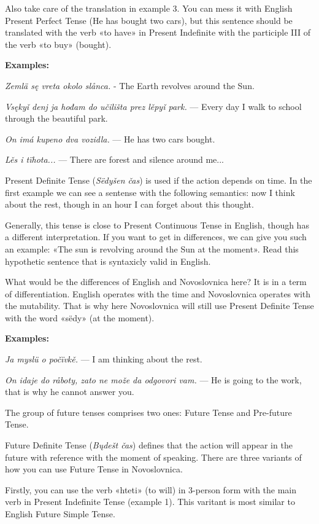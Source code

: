 Also take care of the translation in example 3. You can mess it with English Present Perfect Tense (He has bought two cars), but this sentence should be translated with the verb «to have» in Present Indefinite with the participle III of the verb «to buy» (bought).

\textbf{Examples:}

\textit{Zemlä sę vreta okolo slånca.} - The Earth revolves around the Sun.

\textit{Vsękyǐ denj ja hođam do učilišta prez lěpyǐ park.} — Every day I walk to school through the beautiful park.

\textit{On imá kupeno dva vozidla.} — He has two cars bought.

\textit{Lěs i tïhota...} — There are forest and silence around me...

Present Definite Tense (\textit{Sëdyšen čas}) is used if the action depends on time. In the first example we can see a sentense with the following semantics: now I think about the rest, though in an hour I can forget about this thought.

Generally, this tense is close to Present Continuous Tense in English, though has a different interpretation. If you want to get in differences, we can give you such an example: «The sun is revolving around the Sun at the moment». Read this hypothetic sentence that is syntaxicly valid in English.

What would be the differences of English and Novoslovnica here? It is in a term of differentiation. English operates with the time and Novoslovnica operates with the mutability. That is why here Novoslovnica will still use Present Definite Tense with the word «sëdy» (at the moment).

\textbf{Examples:}

\textit{Ja myslü o počïvkě.} — I am thinking about the rest.

\textit{On idaje do råboty, zato ne može da odgovori vam.} — He is going to the work, that is why he cannot answer you.

The group of future tenses comprises two ones: Future Tense and Pre-future Tense.

Future Definite Tense (\textit{Bųdešt čas}) defines that the action will appear in the future with reference with the moment of speaking. There are three variants of how you can use Future Tense in Novoslovnica.

Firstly, you can use the verb «hteti» (to will) in 3-person form with the main verb in Present Indefinite Tense (example 1). This varitant is most similar to English Future Simple Tense.

